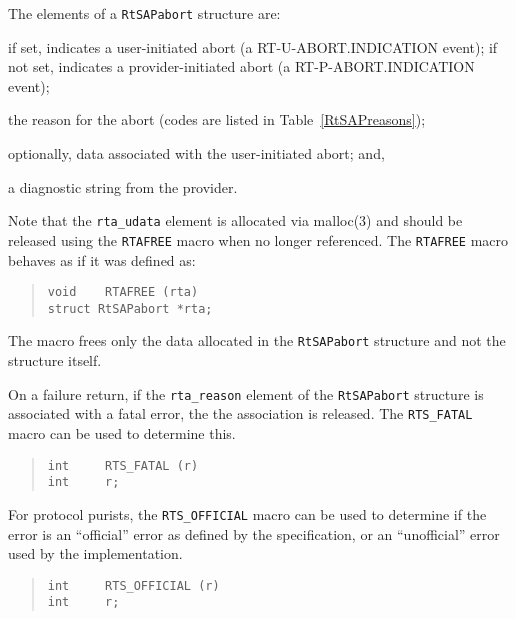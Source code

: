 The elements of a \verb"RtSAPabort" structure are:
\begin{describe}
\item[\verb"rta\_peer":] if set, indicates a user-initiated abort
(a {\sf RT-U-A\-BORT.IN\-DI\-CA\-TION\/} event);
if not set, indicates a provider-initiated abort
(a {\sf RT-P-ABORT.INDICATION\/} event);

\item[\verb"rta\_reason":] the reason for the abort
(codes are listed in Table~\ref{RtSAPreasons});

\item[\verb"rta\_udata":] optionally, data associated with the user-initiated
abort;
and,

\item[\verb"rta\_data"/\verb"rta\_cc":] a diagnostic string from the provider.
\end{describe}
Note that the \verb"rta_udata" element is allocated via \man malloc(3) and
should be released using the \verb"RTAFREE" macro  when no longer referenced.
The \verb"RTAFREE" macro behaves as if it was defined as:
\begin{quote}\small\begin{verbatim}
void    RTAFREE (rta)
struct RtSAPabort *rta;
\end{verbatim}\end{quote}
The macro frees only the data allocated in the \verb"RtSAPabort" structure
and not the structure itself.

On a failure return,
if the \verb"rta_reason" element of the \verb"RtSAPabort" structure is
associated with a fatal error,
the the association is released.
The \verb"RTS_FATAL" macro can be used to determine this.
\begin{quote}\small\begin{verbatim}
int     RTS_FATAL (r)
int     r;
\end{verbatim}\end{quote}
For protocol purists,
the \verb"RTS_OFFICIAL" macro can be used to determine if the error is an
``official'' error as defined by the specification,
or an ``unofficial'' error used by the implementation.
\begin{quote}\small\begin{verbatim}
int     RTS_OFFICIAL (r)
int     r;
\end{verbatim}\end{quote}


